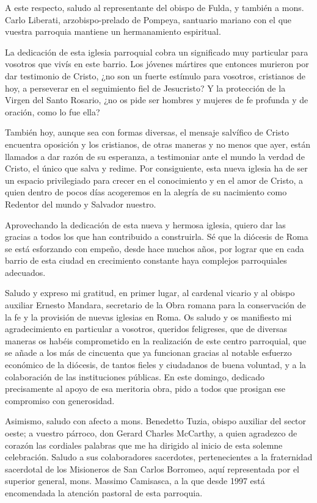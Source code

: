 \begin{body}
					A este respecto, saludo al representante del obispo de Fulda, y también a mons. Carlo Liberati, arzobispo-prelado de Pompeya, santuario mariano con el que vuestra parroquia mantiene un hermanamiento espiritual.
					
					La dedicación de esta iglesia parroquial cobra un significado muy particular para vosotros que vivís en este barrio. Los jóvenes mártires que entonces murieron por dar testimonio de Cristo, ¿no son un fuerte estímulo para vosotros, cristianos de hoy, a perseverar en el seguimiento fiel de Jesucristo? Y la protección de la Virgen del Santo Rosario, ¿no os pide ser hombres y mujeres de fe profunda y de oración, como lo fue ella?
					
					También hoy, aunque sea con formas diversas, el mensaje salvífico de Cristo encuentra oposición y los cristianos, de otras maneras y no menos que ayer, están llamados a dar razón de su esperanza, a testimoniar ante el mundo la verdad de Cristo, el único que salva y redime. Por consiguiente, esta nueva iglesia ha de ser un espacio privilegiado para crecer en el conocimiento y en el amor de Cristo, a quien dentro de pocos días acogeremos en la alegría de su nacimiento como Redentor del mundo y Salvador nuestro.
					
					Aprovechando la dedicación de esta nueva y hermosa iglesia, quiero dar las gracias a todos los que han contribuido a construirla. Sé que la diócesis de Roma se está esforzando con empeño, desde hace muchos años, por lograr que en cada barrio de esta ciudad en crecimiento constante haya complejos parroquiales adecuados.
					
					Saludo y expreso mi gratitud, en primer lugar, al cardenal vicario y al obispo auxiliar Ernesto Mandara, secretario de la Obra romana para la conservación de la fe y la provisión de nuevas iglesias en Roma. Os saludo y os manifiesto mi agradecimiento en particular a vosotros, queridos feligreses, que de diversas maneras os habéis comprometido en la realización de este centro parroquial, que se añade a los más de cincuenta que ya funcionan gracias al notable esfuerzo económico de la diócesis, de tantos fieles y ciudadanos de buena voluntad, y a la colaboración de las instituciones públicas. En este domingo, dedicado precisamente al apoyo de esa meritoria obra, pido a todos que prosigan ese compromiso con generosidad.
					
					Asimismo, saludo con afecto a mons. Benedetto Tuzia, obispo auxiliar del sector oeste; a vuestro párroco, don Gerard Charles McCarthy, a quien agradezco de corazón las cordiales palabras que me ha dirigido al inicio de esta solemne celebración. Saludo a sus colaboradores sacerdotes, pertenecientes a la fraternidad sacerdotal de los Misioneros de San Carlos Borromeo, aquí representada por el superior general, mons. Massimo Camisasca, a la que desde 1997 está encomendada la atención pastoral de esta parroquia.
					

\end{body}
